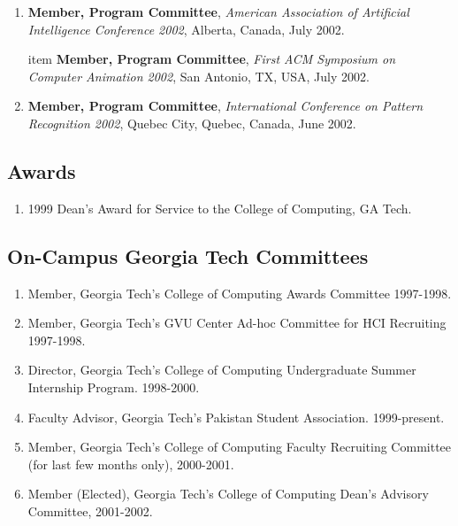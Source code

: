 \begin{enumerate}
\item {\bf Member, Program Committee}, \textit{American Association of Artificial Intelligence Conference 2002}, Alberta,
Canada, July 2002.

item {\bf Member, Program Committee}, \textit{First ACM Symposium on Computer Animation 2002}, San Antonio,
TX, USA, July 2002.

\item {\bf Member, Program Committee}, \textit{International
Conference on Pattern Recognition 2002}, Quebec City, Quebec,
Canada, June 2002.

\end{enumerate}

\subsection{Awards}
\label{subsec:awards}

\begin{enumerate}

\item 1999 Dean's Award for Service to the College of Computing, GA
Tech.

\end{enumerate}
\subsection{On-Campus Georgia Tech Committees}
\label{subsec:mylabel1}

\begin{enumerate}

\item Member, Georgia Tech's College of Computing Awards Committee
1997-1998.

\item Member, Georgia Tech's GVU Center Ad-hoc Committee for HCI
Recruiting 1997-1998.

\item Director, Georgia Tech's College of Computing Undergraduate
Summer Internship Program. 1998-2000.

\item Faculty Advisor, Georgia Tech's Pakistan Student
Association. 1999-present.

\item Member, Georgia Tech's College of Computing Faculty
Recruiting Committee (for last few months only), 2000-2001.

\item Member (Elected), Georgia Tech's College of Computing Dean's Advisory
Committee, 2001-2002.

\end{enumerate}

